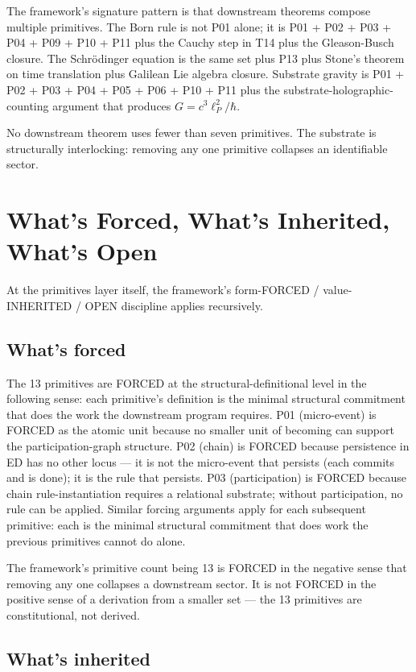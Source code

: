 \documentclass[11pt,a4paper]{article}
\begin{document}
The framework's signature pattern is that downstream theorems compose multiple primitives. The Born rule is not P01 alone; it is P01 + P02 + P03 + P04 + P09 + P10 + P11 plus the Cauchy step in T14 plus the Gleason-Busch closure. The Schr\"odinger equation is the same set plus P13 plus Stone's theorem on time translation plus Galilean Lie algebra closure. Substrate gravity is P01 + P02 + P03 + P04 + P05 + P06 + P10 + P11 plus the substrate-holographic-counting argument that produces $G = c^{3}\ell_P^{2}/\hbar$.

No downstream theorem uses fewer than seven primitives. The substrate is structurally interlocking: removing any one primitive collapses an identifiable sector.

\section{What's Forced, What's Inherited, What's Open}

At the primitives layer itself, the framework's form-FORCED / value-INHERITED / OPEN discipline applies recursively.

\subsection{What's forced}

The 13 primitives are FORCED at the structural-definitional level in the following sense: each primitive's definition is the minimal structural commitment that does the work the downstream program requires. P01 (micro-event) is FORCED as the atomic unit because no smaller unit of becoming can support the participation-graph structure. P02 (chain) is FORCED because persistence in ED has no other locus --- it is not the micro-event that persists (each commits and is done); it is the rule that persists. P03 (participation) is FORCED because chain rule-instantiation requires a relational substrate; without participation, no rule can be applied. Similar forcing arguments apply for each subsequent primitive: each is the minimal structural commitment that does work the previous primitives cannot do alone.

The framework's primitive count being 13 is FORCED in the negative sense that removing any one collapses a downstream sector. It is not FORCED in the positive sense of a derivation from a smaller set --- the 13 primitives are constitutional, not derived.

\subsection{What's inherited}
\end{document}
